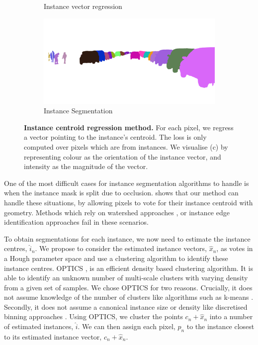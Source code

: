 \begin{figure}[t]
\begin{center}
\begin{subfigure}[t]{0.48\linewidth}
  \caption{Instance vector regression}
\end{subfigure}
\begin{subfigure}[t]{0.48\linewidth}
  \includegraphics[width=\linewidth]{example_instance/bielefeld_000000_001011_instance_segmentation.png}
  \caption{Instance Segmentation}
\end{subfigure}
\end{center}
   \caption[Instance centroid regression method.]{\textbf{Instance centroid regression method.} For each pixel, we regress a vector pointing to the instance's centroid. The loss is only computed over pixels which are from instances. We visualise (c) by representing colour as the orientation of the instance vector, and intensity as the magnitude of the vector.}
\label{fig:instance}
\end{figure}

One of the most difficult cases for instance segmentation algorithms to handle is when the instance mask is split due to occlusion.  shows that our method can handle these situations, by allowing pixels to vote for their instance centroid with geometry. Methods which rely on watershed approaches \cite{bai2016deep}, or instance edge identification approaches fail in these scenarios.

To obtain segmentations for each instance, we now need to estimate the instance centres, $\hat{i}_n$. We propose to consider the estimated instance vectors, $\hat{x}_n$, as votes in a Hough parameter space and use a clustering algorithm to identify these instance centres. OPTICS \cite{ankerst1999optics}, is an efficient density based clustering algorithm. It is able to identify an unknown number of multi-scale clusters with varying density from a given set of samples. We chose OPTICS for two reasons. Crucially, it does not assume knowledge of the number of clusters like algorithms such as k-means \cite{macqueen1967some}. Secondly, it does not assume a canonical instance size or density like discretised binning approaches \cite{comaniciu2002mean}. Using OPTICS, we cluster the points $c_n+\hat{x}_n$ into a number of estimated instances, $\hat{i}$. We can then assign each pixel, $p_n$ to the instance closest to its estimated instance vector, $c_n+\hat{x}_n$.

